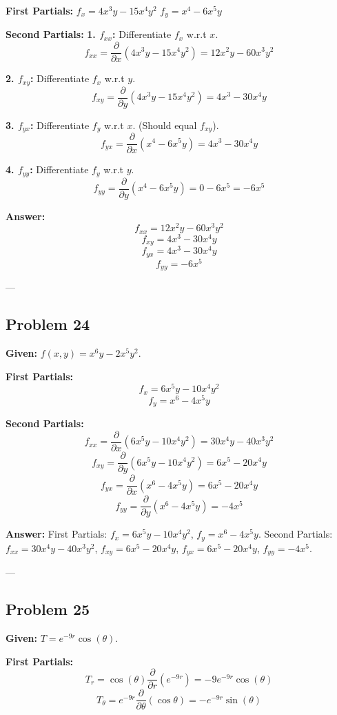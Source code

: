 \documentclass{article}
\begin{document}
\textbf{First Partials:}
$f_x = 4x^3 y - 15x^4 y^2$
$f_y = x^4 - 6x^5 y$

\textbf{Second Partials:}
\textbf{1. $f_{xx}$:} Differentiate $f_x$ w.r.t $x$.
\[ f_{xx} = \frac{\partial}{\partial x}(4x^3 y - 15x^4 y^2) = 12x^2 y - 60x^3 y^2 \]

\textbf{2. $f_{xy}$:} Differentiate $f_x$ w.r.t $y$.
\[ f_{xy} = \frac{\partial}{\partial y}(4x^3 y - 15x^4 y^2) = 4x^3 - 30x^4 y \]

\textbf{3. $f_{yx}$:} Differentiate $f_y$ w.r.t $x$. (Should equal $f_{xy}$).
\[ f_{yx} = \frac{\partial}{\partial x}(x^4 - 6x^5 y) = 4x^3 - 30x^4 y \]

\textbf{4. $f_{yy}$:} Differentiate $f_y$ w.r.t $y$.
\[ f_{yy} = \frac{\partial}{\partial y}(x^4 - 6x^5 y) = 0 - 6x^5 = -6x^5 \]

\textbf{Answer:}
\[ f_{xx} = 12x^2 y - 60x^3 y^2 \]
\[ f_{xy} = 4x^3 - 30x^4 y \]
\[ f_{yx} = 4x^3 - 30x^4 y \]
\[ f_{yy} = -6x^5 \]

---

\subsection*{Problem 24}
\textbf{Given:} $f(x, y) = x^6 y - 2x^5 y^2$.

\textbf{First Partials:}
\[ f_x = 6x^5 y - 10x^4 y^2 \]
\[ f_y = x^6 - 4x^5 y \]

\textbf{Second Partials:}
\[ f_{xx} = \frac{\partial}{\partial x}(6x^5 y - 10x^4 y^2) = 30x^4 y - 40x^3 y^2 \]
\[ f_{xy} = \frac{\partial}{\partial y}(6x^5 y - 10x^4 y^2) = 6x^5 - 20x^4 y \]
\[ f_{yx} = \frac{\partial}{\partial x}(x^6 - 4x^5 y) = 6x^5 - 20x^4 y \]
\[ f_{yy} = \frac{\partial}{\partial y}(x^6 - 4x^5 y) = -4x^5 \]

\textbf{Answer:}
First Partials: $f_x = 6x^5 y - 10x^4 y^2$, $f_y = x^6 - 4x^5 y$.
Second Partials: $f_{xx} = 30x^4 y - 40x^3 y^2$, $f_{xy} = 6x^5 - 20x^4 y$, $f_{yx} = 6x^5 - 20x^4 y$, $f_{yy} = -4x^5$.

---

\subsection*{Problem 25}
\textbf{Given:} $T = e^{-9r} \cos(\theta)$.

\textbf{First Partials:}
\[ T_r = \cos(\theta) \frac{\partial}{\partial r}(e^{-9r}) = -9e^{-9r} \cos(\theta) \]
\[ T_\theta = e^{-9r} \frac{\partial}{\partial \theta}(\cos \theta) = -e^{-9r} \sin(\theta) \]
\end{document}
